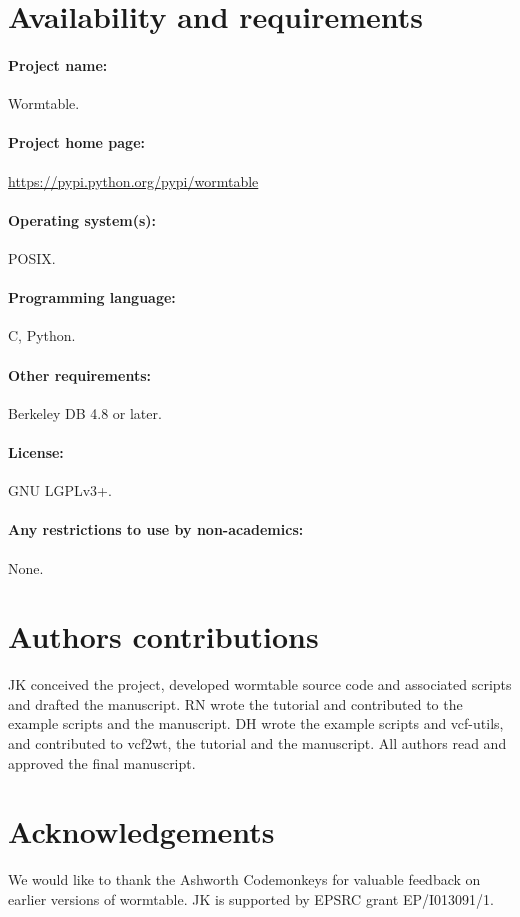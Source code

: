 \documentclass[10pt]{bmc_article}
\newenvironment{bmcformat}{\begin{raggedright}\baselineskip20pt\sloppy\setboolean{publ}{false}}{\end{raggedright}\baselineskip20pt\sloppy}
\begin{document}
\begin{bmcformat}
  
\section*{Availability and requirements}
\paragraph{Project name:} Wormtable.
\paragraph{Project home page:}\url{https://pypi.python.org/pypi/wormtable}
\paragraph{Operating system(s):} POSIX.
\paragraph{Programming language:} C, Python.
\paragraph{Other requirements:} Berkeley DB 4.8 or later.
\paragraph{License:} GNU LGPLv3+.
\paragraph{Any restrictions to use by non-academics:} None.

    
\section*{Authors contributions}
JK conceived the project, developed wormtable source code and associated
scripts and drafted the manuscript. RN wrote the tutorial and contributed to
the example scripts and the manuscript. DH wrote the example scripts and vcf-utils,
and contributed to vcf2wt, the tutorial and the manuscript.
All authors read and approved the final manuscript.


\section*{Acknowledgements}
We would like to thank the Ashworth Codemonkeys for valuable feedback on earlier
versions of wormtable.  JK is supported by EPSRC grant EP/I013091/1.


\end{bmcformat}
\end{document}
